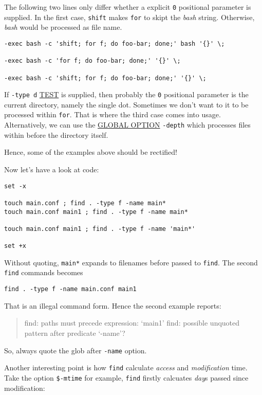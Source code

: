 The following two lines only differ whether a explicit \verb|0|
positional parameter is supplied. In the first case,
\lstinline|shift| makes \lstinline|for| to skipt the \textit{bash}
string. Otherwise, \textit{bash} would be processed as file name.

\begin{lstlisting}
-exec bash -c 'shift; for f; do foo-bar; done;' bash '{}' \;

-exec bash -c 'for f; do foo-bar; done;' '{}' \;

-exec bash -c 'shift; for f; do foo-bar; done;' '{}' \;
\end{lstlisting}

If \lstinline|-type d| \uline{TEST} is supplied, then probably the
\verb|0| positional parameter is the current directory, namely the
single dot. Sometimes we don't want to it to be processed within
\lstinline|for|. That is where the third case comes into
usage. Alternatively, we can use the \uline{GLOBAL OPTION}
\lstinline|-depth| which processes files within before the
directory itself.

Hence, some of the examples above should be rectified!

Now let's have a look at code:

\begin{lstlisting}
set -x

touch main.conf ; find . -type f -name main*
touch main.conf main1 ; find . -type f -name main*

touch main.conf main1 ; find . -type f -name 'main*'

set +x
\end{lstlisting}

Without quoting, \verb|main*| expands to filenames before passed
to \lstinline|find|. The second \lstinline|find| commands becomes

\begin{lstlisting}
find . -type f -name main.conf main1
\end{lstlisting}

That is an illegal command form. Hence the second example reports:

\begin{quotation}
  find: paths must precede expression: `main1'
  find: possible unquoted pattern after predicate `-name'?
\end{quotation}

So, always quote the glob after \lstinline|-name| option.

Another interesting point is how \lstinline|find| calculate
\textit{access} and \textit{modification} time. Take the option
\lstinline|$-mtime| for example, \lstinline|find| firstly
calcuates \textit{day}s passed since modification:

